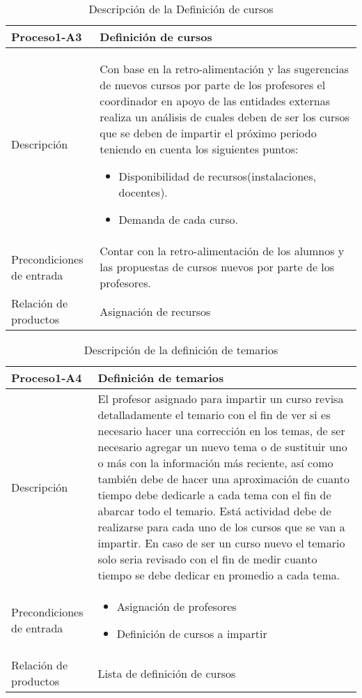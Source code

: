 \begin{table}[H]
	\centering
	\begin{tabular}{p{5cm} p{11cm}}
		\hline
		\rowcolor{LightBlue2} \textbf{Proceso1-A3} & \textbf{Definición de cursos}\\
		\hline\hline
		Descripción & Con base en la retro-alimentación y las sugerencias de nuevos cursos por parte de los profesores el coordinador en apoyo de las entidades externas realiza un análisis de cuales deben de ser los cursos que se deben de impartir el próximo periodo teniendo en cuenta los siguientes puntos:
		\begin{itemize}
			\item Disponibilidad de recursos(instalaciones, docentes).
			\item Demanda de cada curso.
		\end{itemize}
		 \\
		\hline
		Precondiciones de entrada & Contar con la retro-alimentación de los alumnos y las propuestas de cursos nuevos por parte de los profesores. \\				
		\hline
		Relación de productos & Asignación de recursos\\
		\hline
	\end{tabular}
	\caption{Descripción de la Definición de cursos}
\end{table}


\begin{table}[H]
	\centering
	\begin{tabular}{p{5cm} p{11cm}}
		\hline
		\rowcolor{LightBlue2} \textbf{Proceso1-A4} & \textbf{Definición de temarios}\\
		\hline\hline
		Descripción & El profesor asignado para impartir un curso revisa detalladamente el temario con el fin de ver si es necesario hacer una corrección en los temas, de ser necesario agregar un nuevo tema o de sustituir uno o más con la informaci\'on m\'as reciente, as\'i como tambi\'en debe de hacer una aproximaci\'on de cuanto tiempo debe dedicarle a cada tema con el fin de abarcar todo el temario. Est\'a actividad debe de realizarse para cada uno de los cursos que se van a impartir. En caso de ser un curso nuevo el temario solo seria revisado con el fin de medir cuanto tiempo se debe dedicar en promedio a cada tema.\\ 
		\hline
		Precondiciones de entrada & 
		\begin{itemize}
			\item Asignaci\'on de profesores
			\item Definici\'on de cursos a impartir
		\end{itemize}
		\\					
		\hline
		Relación de productos & Lista de definici\'on de cursos\\
		\hline
	\end{tabular}
	\caption{Descripción de la definición de temarios}
\end{table}

